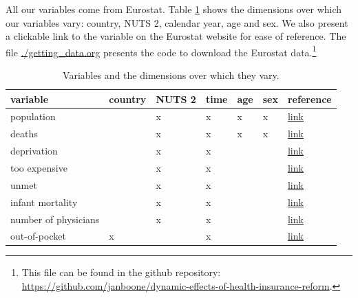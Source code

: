 \documentclass[a4paper,12pt]{article}
\begin{document}
All our variables come from Eurostat. Table \ref{tab:VariablesDimensions} shows the dimensions over which our variables vary: country, NUTS 2, calendar year, age and sex. We also present a clickable link to the variable on the Eurostat website for ease of reference. The file \url{./getting\_data.org} presents the code to download the Eurostat data.\footnote{This file can be found in the github repository: \href{https://github.com/janboone/dynamic-effects-of-health-insurance-reform}{https://github.com/janboone/dynamic-effects-of-health-insurance-reform}.}


\begin{table}[htbp]
\caption{\label{tab:VariablesDimensions}Variables and the dimensions over which they vary.}
\centering
\begin{tabular}{lllllll}
variable & country & NUTS 2 & time & age & sex & reference\\
\hline
population &  & x & x & x & x & \href{https://ec.europa.eu/eurostat/databrowser/view/DEMO\_R\_D2JAN/default/table?lang=en\&category=demo.demopreg}{link}\\
deaths &  & x & x & x & x & \href{https://ec.europa.eu/eurostat/databrowser/view/DEMO\_R\_MAGEC/default/table?lang=en\&category=demo.demomreg}{link}\\
deprivation &  & x & x &  &  & \href{https://ec.europa.eu/eurostat/databrowser/view/tgs00104/default/table?lang=en}{link}\\
too expensive &  & x & x &  &  & \href{https://ec.europa.eu/eurostat/databrowser/view/hlth\_silc\_08\_r/default/table?lang=en}{link}\\
unmet &  & x & x &  &  & \href{https://ec.europa.eu/eurostat/databrowser/view/hlth\_silc\_08\_r/default/table?lang=en}{link}\\
infant mortality &  & x & x &  &  & \href{https://ec.europa.eu/eurostat/databrowser/view/DEMO\_R\_MINFIND/default/table?lang=en\&category=demo.demomreg}{link}\\
number of physicians &  & x & x &  &  & \href{https://ec.europa.eu/eurostat/databrowser/view/hlth\_rs\_physreg/default/table?lang=en\&category=hlth.hlth\_care.hlth\_res.hlth\_staff}{link}\\
out-of-pocket & x &  & x &  &  & \href{https://ec.europa.eu/eurostat/databrowser/view/hlth\_sha11\_hf/default/table?lang=en}{link}\\
\end{tabular}
\end{table}
\end{document}
